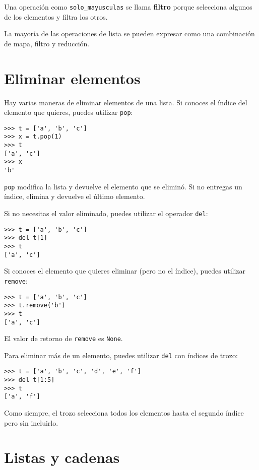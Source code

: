 \documentclass[10pt]{book}
\begin{document}
Una operación como \verb"solo_mayusculas" se llama {\bf filtro} porque
selecciona algunos de los elementos y filtra los otros.

La mayoría de las operaciones de lista se pueden expresar como una combinación
de mapa, filtro y reducción.


\section{Eliminar elementos}

Hay varias maneras de eliminar elementos de una lista.  Si conoces
el índice del elemento que quieres, puedes utilizar
{\tt pop}:

\begin{verbatim}
>>> t = ['a', 'b', 'c']
>>> x = t.pop(1)
>>> t
['a', 'c']
>>> x
'b'
\end{verbatim}
%
{\tt pop} modifica la lista y devuelve el elemento que se eliminó.
Si no entregas un índice, elimina y devuelve el
último elemento.

Si no necesitas el valor eliminado, puedes utilizar el
operador {\tt del}:

\begin{verbatim}
>>> t = ['a', 'b', 'c']
>>> del t[1]
>>> t
['a', 'c']
\end{verbatim}
%
Si conoces el elemento que quieres eliminar (pero no el índice),
puedes utilizar {\tt remove}:

\begin{verbatim}
>>> t = ['a', 'b', 'c']
>>> t.remove('b')
>>> t
['a', 'c']
\end{verbatim}
%
El valor de retorno de {\tt remove} es {\tt None}.

Para eliminar más de un elemento, puedes utilizar {\tt del} con
índices de trozo:

\begin{verbatim}
>>> t = ['a', 'b', 'c', 'd', 'e', 'f']
>>> del t[1:5]
>>> t
['a', 'f']
\end{verbatim}
%
Como siempre, el trozo selecciona todos los elementos hasta el segundo índice
pero sin incluirlo.



\section{Listas y cadenas}
\end{document}
